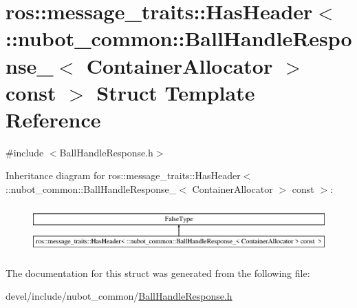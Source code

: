 \hypertarget{structros_1_1message__traits_1_1HasHeader_3_01_1_1nubot__common_1_1BallHandleResponse___3_01Contf2ba5a2d1847fba09f16e3ba9c40c817}{\section{ros\-:\-:message\-\_\-traits\-:\-:Has\-Header$<$ \-:\-:nubot\-\_\-common\-:\-:Ball\-Handle\-Response\-\_\-$<$ Container\-Allocator $>$ const $>$ Struct Template Reference}
\label{structros_1_1message__traits_1_1HasHeader_3_01_1_1nubot__common_1_1BallHandleResponse___3_01Contf2ba5a2d1847fba09f16e3ba9c40c817}
}


{\ttfamily \#include $<$Ball\-Handle\-Response.\-h$>$}

Inheritance diagram for ros\-:\-:message\-\_\-traits\-:\-:Has\-Header$<$ \-:\-:nubot\-\_\-common\-:\-:Ball\-Handle\-Response\-\_\-$<$ Container\-Allocator $>$ const $>$\-:\begin{figure}[H]
\begin{center}
\leavevmode
\includegraphics[height=1.836066cm]{structros_1_1message__traits_1_1HasHeader_3_01_1_1nubot__common_1_1BallHandleResponse___3_01Contf2ba5a2d1847fba09f16e3ba9c40c817}
\end{center}
\end{figure}


The documentation for this struct was generated from the following file\-:\begin{DoxyCompactItemize}
\item 
devel/include/nubot\-\_\-common/\hyperlink{BallHandleResponse_8h}{Ball\-Handle\-Response.\-h}\end{DoxyCompactItemize}
